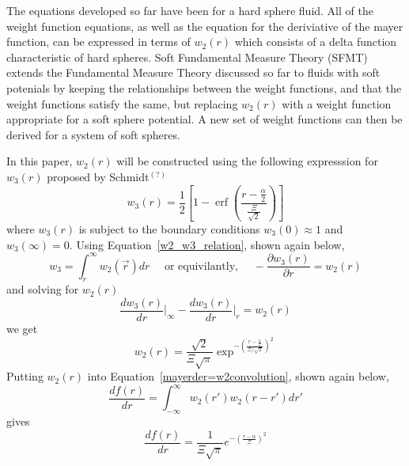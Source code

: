 \documentclass[double,12pt]{beavtex}
\begin{document}
The equations developed so far have been for a hard sphere fluid. All of the weight function equations, as well as the equation for the deriviative of the mayer function, can be expressed in terms of $w_{2}(r)$ which consists of a delta function characteristic of hard spheres. Soft Fundamental Measure Theory (SFMT) extends the Fundamental Measure Theory discussed so far to fluids with soft potenials by keeping the relationships between the weight functions, and that the weight functions satisfy the same, but replacing $w_{2}(r)$ with a weight function appropriate for a soft sphere potential. A new set of weight functions can then be derived for a system of soft spheres. 

In this paper,  $w_{2}(r)$ will be constructed using the following expresssion for $w_3(r)$ proposed by Schmidt$^{(?)}$ 
\begin{equation}{w_3(r)=\frac{1}{2}}\left[1-\operatorname{erf}\left(\frac{r-\frac{\alpha}{2}}{\frac{\Xi}{\sqrt{2}}}\right)\right]\end{equation} 
 where $w_3(r)$ is subject to the boundary conditions $w_3(0)\approx{1}$ and $w_3(\infty)=0$. 
Using Equation~\ref{w2_w3_relation}, shown again below, 
\begin{displaymath}{w_{3}=\int_{r}^{\infty}{w_{2}(\vec{r})dr}\mbox{~~~~or equivilantly,~~~~}-\frac{\partial{w_3(r)}}{\partial{r}}=w_2(r)}\end{displaymath}
and solving for $w_2(r)$
\begin{displaymath}{\frac{dw_3(r)}{dr}\bigg|_{\infty}-\frac{dw_3(r)}{dr}\bigg|_{r}=w_2(r)}\end{displaymath} 
we get \begin{equation}{ w_2(r)=\frac{\sqrt{2}}{\Xi\sqrt\pi}\exp^{-\left(\frac{r-\frac{\alpha}{2}}{\Xi/\sqrt{2}}\right)^2} }\end{equation} %
Putting $w_2(r)$ into Equation~\ref{mayerder=w2convolution}, shown again below, 
\begin{displaymath}{\frac{df(r)}{dr}=\int_{-\infty}^{\infty}{w_2(r')w_2(r-r')dr'}}\end{displaymath}
gives
\begin{equation}{\frac{df(r)}{dr}=\frac{1}{\Xi\sqrt{\pi}}e^{-\left(\frac{r-\alpha}{\Xi}\right)^2}}\end{equation} 
\end{document}
